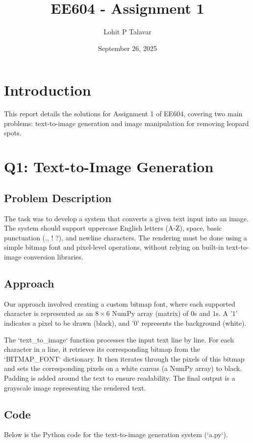 \documentclass[12pt]{article}
\title{EE604 - Assignment 1}
\author{Lohit P Talavar}
\date{September 26, 2025}
\begin{document}
\maketitle

\section*{Introduction}
This report details the solutions for Assignment 1 of EE604, covering two main problems: text-to-image generation and image manipulation for removing leopard spots.

\section*{Q1: Text-to-Image Generation}
\subsection*{Problem Description}
The task was to develop a system that converts a given text input into an image. The system should support uppercase English letters (A-Z), space, basic punctuation (., ! ?), and newline characters. The rendering must be done using a simple bitmap font and pixel-level operations, without relying on built-in text-to-image conversion libraries.

\subsection*{Approach}
Our approach involved creating a custom bitmap font, where each supported character is represented as an $8 \times 6$ NumPy array (matrix) of $0$s and $1$s. A '$1$' indicates a pixel to be drawn (black), and '$0$' represents the background (white).

The `text_to_image` function processes the input text line by line. For each character in a line, it retrieves its corresponding bitmap from the `BITMAP_FONT` dictionary. It then iterates through the pixels of this bitmap and sets the corresponding pixels on a white canvas (a NumPy array) to black. Padding is added around the text to ensure readability. The final output is a grayscale image representing the rendered text.

\subsection*{Code}
Below is the Python code for the text-to-image generation system (`a.py`).

\end{document}
